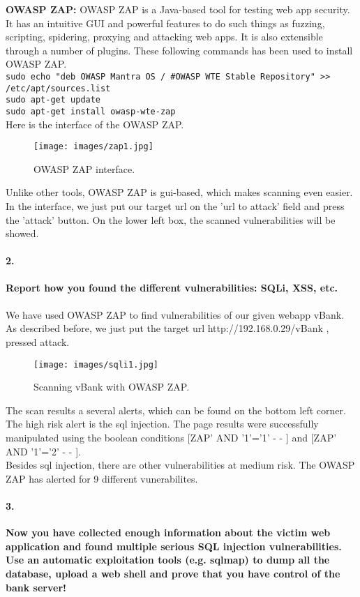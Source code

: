 \documentclass[12pt]{report}
\begin{document}
	{\bf OWASP ZAP: } OWASP ZAP is a Java-based tool for testing web app security. It has an intuitive GUI and powerful features to do such things as fuzzing, scripting, spidering, proxying and attacking web apps. It is also extensible through a number of plugins. These following commands has been used to install OWASP ZAP.\\
	{\tt sudo echo "deb OWASP Mantra OS / \#OWASP WTE Stable Repository" >> /etc/apt/sources.list}\\
	{\tt sudo apt-get update}\\
	{\tt sudo apt-get install owasp-wte-zap}\\
	
	Here is the interface of the OWASP ZAP.
	\begin{figure}[H]
		\texttt{[image: images/zap1.jpg]}
		\caption{OWASP ZAP interface.}
	\end{figure}
	
	Unlike other tools, OWASP ZAP is gui-based, which makes scanning even easier. In the interface, we just put our target url on the 'url to attack' field and press the 'attack' button. On the lower left box, the scanned vulnerabilities will be showed.
	
	\paragraph*{2.}{\bf Report how you found the different vulnerabilities: SQLi, XSS, etc.}\\\\
	
	We have used OWASP ZAP to find vulnerabilities of our given webapp vBank. As described before, we just put the target url {\sf http://192.168.0.29/vBank} ,  pressed attack. 
	\begin{figure}[H]
		\texttt{[image: images/sqli1.jpg]}
		\caption{Scanning vBank with OWASP ZAP.}
	\end{figure}
	
	The scan results a several alerts, which can be found on the bottom left corner. The high risk alert is the sql injection. The page results were successfully manipulated using the boolean conditions [ZAP' AND '1'='1' - - ] and [ZAP' AND '1'='2' - - ].\\
	Besides sql injection, there are other vulnerabilities at medium risk. The OWASP ZAP has alerted for 9 different vunerabilites.\\
	
	\paragraph*{3.}{\bf Now you have collected enough information about the victim web application and found multiple serious SQL injection vulnerabilities.
	Use an automatic exploitation tools (e.g. sqlmap) to dump all the database, upload a web shell and prove that you have control of the bank server!}\\\\
\end{document}
